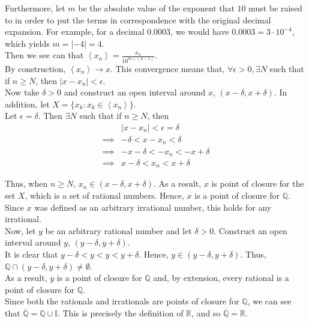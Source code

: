 \documentclass[12pt]{article}
\begin{document}
Furthermore, let $m$ be the absolute value of the exponent that $10$ must be raised to in order to put the terms in correspondence with the original decimal expansion. For example, for a decimal 0.0003, we would have $0.0003 = 3\cdot10^{-4}$, which yields $m = |-4| = 4$.\\

Then we see can that $\left<x_n\right> = \frac{x_n}{10^{m+(n-1)}}$.\\

By construction, $\left<x_n\right> \to x$. This convergence means that, $\forall \epsilon > 0, \exists N$ such that if $n \geq N$, then $| x - x_n | < \epsilon$.\\

Now take $\delta > 0$ and construct an open interval around $x$, $(x - \delta, x + \delta)$. In addition, let $X = \{x_k: x_k \in \left<x_n\right>\}$.\\

Let $\epsilon = \delta$. Then $\exists N$ such that if $n \geq N$, then
\begin{align*}
&| x - x_n | < \epsilon = \delta\\
\implies &-\delta < x - x_n < \delta\\
\implies &-x - \delta < - x_n < -x + \delta\\
\implies &x - \delta < x_n < x + \delta
\end{align*} 

Thus, when $n \geq N$, $x_n \in (x - \delta, x + \delta)$. As a result, $x$ is point of closure for the set $X$, which is a set of rational numbers. Hence, $x$ is a point of closure for $\mathbb{Q}$. Since $x$ was defined as an arbitrary irrational number, this holds for any irrational.\\

Now, let $y$ be an arbitrary rational number and let $\delta > 0$. Construct an open interval around $y$, $(y - \delta, y + \delta)$.\\

It is clear that $y - \delta < y < y < y + \delta$. Hence, $y \in (y - \delta, y + \delta)$. Thus, $\mathbb{Q} \cap (y - \delta, y + \delta) \neq \emptyset$.\\

As a result, $y$ is a point of closure for $\mathbb{Q}$ and, by extension, every rational is a point of closure for $\mathbb{Q}$.\\

Since both the rationals and irrationals are points of closure for $\mathbb{Q}$, we can see that $\overline{\mathbb{Q}} = \mathbb{Q} \cup \mathbb{I}$. This is precisely the definition of $\mathbb{R}$, and so $\overline{\mathbb{Q}} = \mathbb{R}$.
\end{document}
